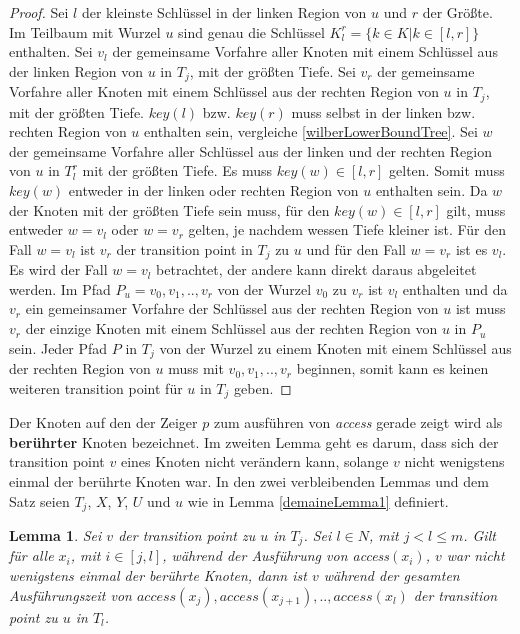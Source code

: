 \documentclass[a4paper,12pt]{article}
\begin{document}
\begin{proof}
Sei $l$ der kleinste Schlüssel in der linken Region von $u$ und $r$ der Größte. Im Teilbaum mit Wurzel $u$ sind genau die Schlüssel $K^r_l = \{k \in K \vert k \in \left[l,r\right]\}$ enthalten. Sei $v_l$ der gemeinsame Vorfahre aller Knoten mit einem Schlüssel aus der linken Region von $u$ in $T_j$, mit der größten Tiefe. Sei $v_r$ der gemeinsame Vorfahre aller Knoten mit einem Schlüssel aus der rechten Region von $u$ in $T_j$, mit der größten Tiefe. $\mathit{key\left(l\right)}$ bzw. $\mathit{key\left(r\right)}$ muss selbst in der linken bzw. rechten Region von $u$ enthalten sein, vergleiche \ref{wilberLowerBoundTree}. Sei $w$ der gemeinsame Vorfahre aller Schlüssel aus der linken und der rechten Region von $u$ in $T^r_l$ mit der größten Tiefe. Es muss $\mathit{key}\left(w\right) \in \left[l,r\right]$ gelten. Somit muss  $\mathit{key}\left(w\right)$ entweder in der linken oder rechten Region von $u$ enthalten sein. Da $w$ der Knoten mit der größten Tiefe sein muss, für den  $\mathit{key\left(w\right)} \in \left[l,r\right]$  gilt, muss entweder $w = v_l$ oder $w = v_r$ gelten, je nachdem wessen Tiefe kleiner ist. Für den Fall $w = v_l$ ist $v_r$ der transition point in $T_j$ zu $u$ und für den Fall $w = v_r$ ist es $v_l$.
Es wird der Fall $w = v_l$ betrachtet, der andere kann direkt daraus abgeleitet werden. Im Pfad $P_u = v_0,v_1,..,v_r$ von der Wurzel $v_0$ zu $v_r$ ist $v_l$ enthalten und da $v_r$ ein gemeinsamer Vorfahre der Schlüssel aus der rechten Region von $u$ ist muss $v_r$ der einzige Knoten mit einem Schlüssel aus der rechten Region von $u$ in $P_u$ sein. Jeder Pfad $P$ in $T_j$ von der Wurzel zu einem Knoten mit einem Schlüssel aus der rechten Region von $u$ muss mit $v_0,v_1,..,v_r$ beginnen, somit kann es keinen weiteren transition point für $u$ in $T_j$ geben. 
	
\end{proof}
\noindent Der Knoten auf den der Zeiger $p$ zum ausführen von \textit{access} gerade zeigt wird als \textbf{berührter} Knoten bezeichnet.
 Im zweiten Lemma geht es darum, dass sich der transition point $v$ eines Knoten nicht verändern kann, solange $v$ nicht wenigstens einmal der berührte Knoten war. In den zwei verbleibenden Lemmas und dem Satz seien  $T_j$, $X$, $Y$, $U$ und $u$ wie in  Lemma \ref{demaineLemma1} definiert. 



\newtheorem{Lemma2}{Lemma}[section] \label{lemmaDemaine2}
\begin{Lemma2} \label{demaineLemma2}
Sei $v$ der transition point zu $u$ in $T_j$.  Sei  $l \in \mathit{N}$, mit $j < l \leq m$. Gilt für alle $x_i$, mit $i \in \left[j,l\right]$, während der Ausführung von \textit{access}$\left(x_i\right)$,  $v$ war nicht wenigstens einmal der berührte Knoten, dann ist $v$ während der gesamten Ausführungszeit von $\textit{access}\left(x_j\right),\textit{access}\left(x_{j+1}\right),..,\textit{access}\left(x_l\right)$ der transition point zu $u$ in $T_l$. 
\end{Lemma2}
\end{document}
